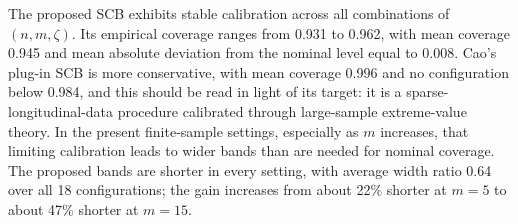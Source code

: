 \documentclass[12pt]{article} %
\theoremstyle{definition}
\begin{document}
\begin{table}[t!]
\caption{Part 1, \(n=300\): empirical simultaneous coverage and average band
width for \(\beta_1\). The width ratio is the average width of the proposed
band divided by that of Cao's band.}
\label{tab:part1-300}\par
{}
\end{table}

The proposed SCB exhibits stable calibration across all combinations of
\((n,m,\zeta)\). Its empirical coverage ranges from 0.931 to 0.962, with mean
coverage 0.945 and mean absolute deviation from the nominal level equal to
0.008. Cao's plug-in SCB is more conservative, with mean coverage 0.996 and
no configuration below 0.984, and this should be read in light of its target:
it is a sparse-longitudinal-data procedure calibrated through large-sample
extreme-value theory. In the present finite-sample settings, especially as
\(m\) increases, that limiting calibration leads to wider bands than are
needed for nominal coverage. The proposed bands are shorter in every setting,
with average width ratio 0.64 over all 18 configurations; the gain increases
from about 22\% shorter at \(m=5\) to about 47\% shorter at \(m=15\).
\end{document}
